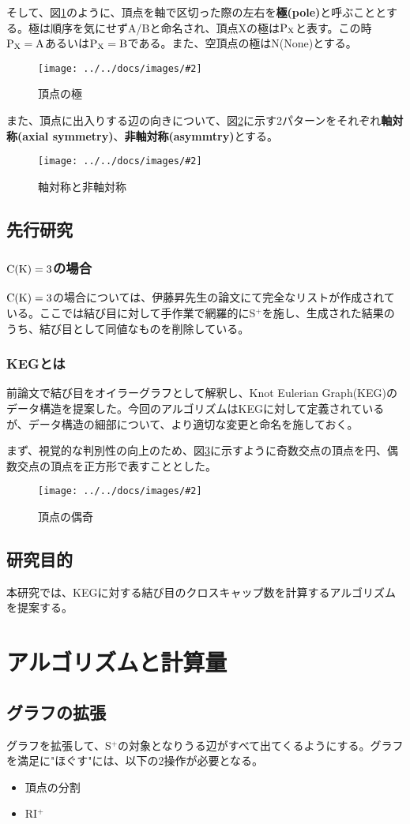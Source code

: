 \documentclass[11pt,a4j]{jarticle}
\newcommand{\splus}{S${}^\text{+}$}
\newcommand{\riplus}{RI${}^\text{+}$}
\newcommand{\f}[1]{$\rm{#1}$} %
\newcommand{\image}[4][height=100pt]{%
\begin{figure}[htbp]
    \centering
    \texttt{[image: ../../docs/images/\#2]}
    \caption{#3}
    \label{fig:#4}
\end{figure}%
}
\newcommand{\tops}[2]{\texorpdfstring{#1}{#2}} %
\begin{document}
そして、図\ref{fig:pole}のように、頂点を軸で区切った際の左右を\textbf{極(pole)}と呼ぶこととする。極は順序を気にせずA/Bと命名され、頂点Xの極は\f{P_X}と表す。この時\f{P_X=A}あるいは\f{P_X=B}である。また、空頂点の極はN(None)とする。
\image[height=200pt]{about_pole.jpg}{頂点の極}{pole}

また、頂点に出入りする辺の向きについて、図\ref{fig:axis}に示す2パターンをそれぞれ\textbf{軸対称(axial symmetry)}、\textbf{非軸対称(asymmtry)}とする。
\image{about_axis.jpg}{軸対称と非軸対称}{axis}

\subsection{先行研究}
\subsubsection{\tops{\f{C(K)=3}}{C(K)=3}の場合}
\f{C(K)=3}の場合については、伊藤昇先生の論文\cite{ck3}にて完全なリストが作成されている。ここでは結び目に対して手作業で網羅的に\splus を施し、生成された結果のうち、結び目として同値なものを削除している。

\subsubsection{KEGとは}
前論文\cite{keg}で結び目をオイラーグラフとして解釈し、Knot Eulerian Graph(KEG)のデータ構造を提案した。今回のアルゴリズムはKEGに対して定義されているが、データ構造の細部について、より適切な変更と命名を施しておく。

まず、視覚的な判別性の向上のため、図\ref{fig:parity}に示すように奇数交点の頂点を円、偶数交点の頂点を正方形で表すこととした。
\image{about_parity.jpg}{頂点の偶奇}{parity}

\subsection{研究目的}
本研究では、KEGに対する結び目のクロスキャップ数を計算するアルゴリズムを提案する。

\section{アルゴリズムと計算量}

\subsection{グラフの拡張}
グラフを拡張して、\splus の対象となりうる辺がすべて出てくるようにする。グラフを満足に"ほぐす"には、以下の2操作が必要となる。
\begin{itemize}
    \item 頂点の分割
    \item \riplus
\end{itemize}
\end{document}
